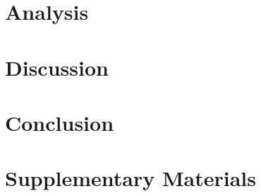 \documentclass[11pt,a4paper]{article}
\begin{document}
\section{Analysis}
\label{sec:analysis}


\section{Discussion}
\label{sec:discussion}


\section{Conclusion}
\label{sec:conclusion}





\appendix
\section{Supplementary Materials}
\label{sec:supplementary}

\end{document}

